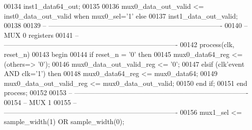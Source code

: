 \begin{DoxyCode}
00134                                 inst1\_data64\_out;
00135                     
00136 \textcolor{vhdlchar}{mux0_data_out_valid}     \textcolor{vhdlchar}{<=} \textcolor{vhdlchar}{inst0_data_out_valid} \textcolor{keywordflow}{when} \textcolor{vhdlchar}{mux0_sel}\textcolor{vhdlchar}{=}\textcolor{vhdlchar}{'}\textcolor{vhdllogic}{}\textcolor{vhdllogic}{1}\textcolor{vhdlchar}{'} \textcolor{keywordflow}{else} 
00137                                 inst1\_data\_out\_valid;
00138             
00139 \textcolor{keyword}{-- ----------------------------------------------------------------------------}
00140 \textcolor{keyword}{-- MUX 0 registers}
00141 \textcolor{keyword}{-- ----------------------------------------------------------------------------}
00142 \textcolor{keywordflow}{process}(clk, reset_n)
00143 \textcolor{vhdlkeyword}{begin }
00144     \textcolor{keywordflow}{if} \textcolor{vhdlchar}{reset_n} \textcolor{vhdlchar}{=} \textcolor{vhdlchar}{'}\textcolor{vhdllogic}{}\textcolor{vhdllogic}{0}\textcolor{vhdlchar}{'} \textcolor{keywordflow}{then} 
00145         \textcolor{vhdlchar}{mux0_data64_reg}             \textcolor{vhdlchar}{<=} \textcolor{vhdlchar}{(}\textcolor{keywordflow}{others}\textcolor{vhdlchar}{=}\textcolor{vhdlchar}{>} \textcolor{vhdlchar}{'}\textcolor{vhdllogic}{}\textcolor{vhdllogic}{0}\textcolor{vhdlchar}{'}\textcolor{vhdlchar}{)};
00146         \textcolor{vhdlchar}{mux0_data_out_valid_reg} \textcolor{vhdlchar}{<=} \textcolor{vhdlchar}{'}\textcolor{vhdllogic}{}\textcolor{vhdllogic}{0}\textcolor{vhdlchar}{'};
00147     \textcolor{keywordflow}{elsif} \textcolor{vhdlchar}{(}\textcolor{vhdlchar}{clk}\textcolor{vhdlchar}{'}\textcolor{vhdlkeyword}{event} \textcolor{keywordflow}{AND} \textcolor{vhdlchar}{clk}\textcolor{vhdlchar}{=}\textcolor{vhdlchar}{'}\textcolor{vhdllogic}{}\textcolor{vhdllogic}{1}\textcolor{vhdlchar}{'}\textcolor{vhdlchar}{)} \textcolor{keywordflow}{then} 
00148         \textcolor{vhdlchar}{mux0_data64_reg}             \textcolor{vhdlchar}{<=} \textcolor{vhdlchar}{mux0_data64};
00149         \textcolor{vhdlchar}{mux0_data_out_valid_reg} \textcolor{vhdlchar}{<=} \textcolor{vhdlchar}{mux0_data_out_valid};
00150     \textcolor{keywordflow}{end} \textcolor{keywordflow}{if};
00151 \textcolor{keywordflow}{end} \textcolor{keywordflow}{process};
00152 
00153 \textcolor{keyword}{-- ----------------------------------------------------------------------------}
00154 \textcolor{keyword}{-- MUX 1 }
00155 \textcolor{keyword}{-- ----------------------------------------------------------------------------}
00156 \textcolor{vhdlchar}{mux1_sel}                    \textcolor{vhdlchar}{<=} \textcolor{vhdlchar}{sample_width}\textcolor{vhdlchar}{(}\textcolor{vhdllogic}{}\textcolor{vhdllogic}{1}\textcolor{vhdlchar}{)} \textcolor{keywordflow}{OR} \textcolor{vhdlchar}{sample_width}\textcolor{vhdlchar}{(}\textcolor{vhdllogic}{}\textcolor{vhdllogic}{0}\textcolor{vhdlchar}{)};

\end{DoxyCode}
